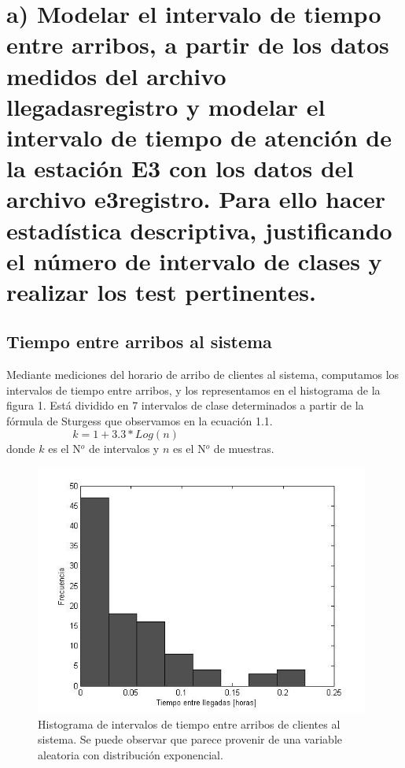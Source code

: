 \documentclass{article}
\numberwithin{equation}{section}
\numberwithin{figure}{section}
\numberwithin{table}{section}
\begin{document}
%
%
\setcounter{page}{1}

%
%

\newpage

%
%

\newpage


\section*{a)   Modelar el intervalo de tiempo entre arribos, a partir de los datos medidos del archivo
llegadasregistro y modelar el intervalo de tiempo de atenci\'on de la estaci\'on E3 con los
datos del archivo e3registro. Para ello hacer estad\'istica descriptiva, justificando el n\'umero
de intervalo de clases y realizar los test pertinentes.
}

\subsection*{Tiempo entre arribos al sistema}
Mediante mediciones del horario de arribo de clientes al sistema, computamos
los intervalos de tiempo entre arribos, y los representamos en el histograma
de la figura 1. Est\'a dividido en 7 intervalos de clase determinados a partir
de la f\'ormula de Sturgess que observamos en la ecuaci\'on 1.1.
\begin{equation}
 k = 1 + 3.3 * Log(n)  \hspace{6cm} 
\end{equation}
donde $k$ es el N$^o$ de intervalos y $n$ es el N$^o$ de muestras.

\begin{figure}
\begin{center}
\includegraphics[width=11cm]{histograma_llegadas}
\caption{Histograma de intervalos de tiempo entre arribos de clientes al sistema. Se puede observar que parece provenir de una variable aleatoria con distribuci\'on exponencial.}
\end{center}
\end{figure}
\end{document}
